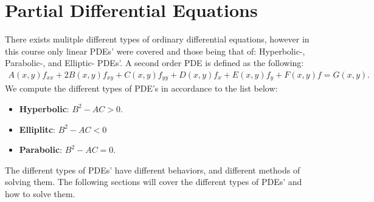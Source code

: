 \documentclass[12pt]{article}
\begin{document}
\section{Partial Differential Equations}
There exists mulitple different types of ordinary differential equations, however in this course only linear PDEs' were covered and those being that of: Hyperbolic-, Parabolic-, and Elliptic- PDEs'. A second order PDE is defined as the following:
\begin{align}
    A(x,y)f_{xx} + 2B(x,y)f_{xy} + C(x,y)f_{yy} + D(x,y)f_x + E(x,y)f_y + F(x,y)f = G(x,y).\label{eq: general PDE of second order}
\end{align}We compute the different types of PDE's in accordance to the list below:
\begin{itemize}
    \item \textbf{Hyperbolic}: $B^2 - AC > 0$.
    \item \textbf{Elliplitc}: $B^2 - AC < 0$ 
    \item \textbf{Parabolic}: $B^2 - AC = 0$.
\end{itemize}The different types of PDEs' have different behaviors, and different methods of solving them. The following sections will cover the different types of PDEs' and how to solve them.
\end{document}
